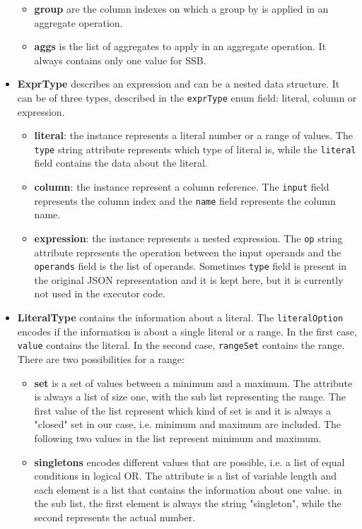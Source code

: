 \documentclass[a4paper, 10pt]{article}
\begin{document}
\begin{itemize}
\begin{itemize}
              \item \textbf{group} are the column indexes on which a group by is applied in an aggregate operation.
              \item \textbf{aggs} is the list of aggregates to apply in an aggregate operation. It always contains only one value for SSB.
          \end{itemize}
    \item \textbf{ExprType} describes an expression and can be a nested data structure. It can be of three types, described in the \texttt{exprType} enum field: literal, column or expression.
          \begin{itemize}
              \item \textbf{literal}: the instance represents a literal number or a range of values. The \texttt{type} string attribute represents which type of literal is, while the \texttt{literal} field contains the data about the literal.
              \item \textbf{column}: the instance represent a column reference. The \texttt{input} field represents the column index and the \texttt{name} field represents the column name.
              \item \textbf{expression}: the instance represents a nested expression. The \texttt{op} string attribute represents the operation between the input operands and the \texttt{operands} field is the list of operands. Sometimes \texttt{type} field is present in the original JSON representation and it is kept here, but it is currently not used in the executor code.
          \end{itemize}
    \item \textbf{LiteralType} contains the information about a literal. The \texttt{literalOption} encodes if the information is about a single literal or a range. In the first case, \texttt{value} contains the literal. In the second case, \texttt{rangeSet} contains the range. There are two possibilities for a range:
          \begin{itemize}
              \item \textbf{set} is a set of values between a minimum and a maximum. The attribute is always a list of size one, with the sub list representing the range. The first value of the list represent which kind of set is and it is always a "closed" set in our case, i.e. minimum and maximum are included. The following two values in the list represent minimum and maximum.
              \item \textbf{singletons} encodes different values that are possible, i.e. a list of equal conditions in logical OR. The attribute is a list of variable length and each element is a list that contains the information about one value. in the sub list, the first element is always the string "singleton", while the second represents the actual number.

\end{itemize}
\end{itemize}
\end{document}
